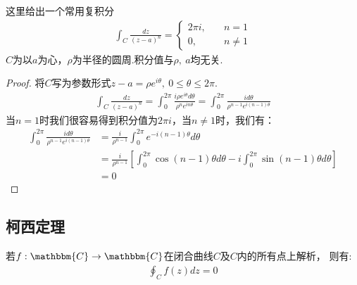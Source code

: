 \documentclass[lang=cn, titlestyle=display, scheme=chinese]{elegantbook}
\begin{document}
                \begin{example}
                    \label{ex:important_integral}
                    这里给出一个常用复积分
                    \begin{align*}
                        \int_{C}\frac{dz}{(z - a)^n} = 
                        \left\{
                            \begin{aligned}
                                2\pi i ,& \quad n = 1 \\
                                0 ,& \quad n \neq 1
                            \end{aligned}
                        \right.
                    \end{align*}
                    $C$为以$a$为心，$\rho$为半径的圆周.积分值与$\rho,\ a$均无关.
                \end{example}
                \begin{proof}
                    \label{proof:important_integral}
                    将$C$写为参数形式$z - a = \rho e^{i\theta},\ 0 \leq \theta \leq 2\pi$.
                    \begin{align*}
                        \int_{C}\frac{dz}{(z - a)^n} = \int_{0}^{2\pi}\frac{i \rho e^{i\theta}d\theta}{\rho^n e^{in\theta}} = \int_{0}^{2\pi}\frac{id\theta}{\rho^{n - 1}e^{i(n-1)\theta}}
                    \end{align*}
                    当$n = 1$时我们很容易得到积分值为$2\pi i$，当$n \neq 1$时，我们有：
                    \begin{align*}
                        \int_{0}^{2\pi}\frac{id\theta}{\rho^{n - 1}e^{i(n-1)\theta}}
                        &= \frac{i}{\rho^{n - 1}}\int_{0}^{2\pi}e^{-i(n-1)\theta}d\theta\\
                        &= \frac{i}{\rho^{n - 1}}\left[ \int_{0}^{2\pi}\cos{(n - 1)\theta}d\theta - i \int_{0}^{2\pi}\sin{(n - 1)\theta}d\theta \right]\\
                        &= 0
                    \end{align*}
                \end{proof}

            \subsection{柯西定理}
                \begin{theorem}[Cauchy 定理]\label{the:cauchy_theorem}
                    若$f:\mathbbm{C}\to\mathbbm{C}$在闭合曲线$C$及$C$内的所有点上解析，
                    则有:
                    \begin{align*}
                        \oint_{C}f(z)dz = 0
                    \end{align*}
                \end{theorem}
\end{document}

